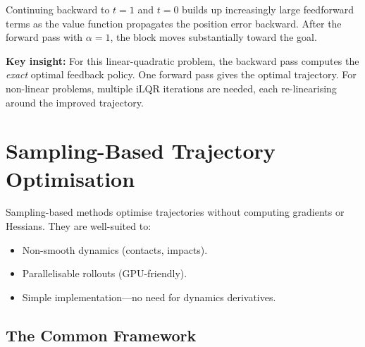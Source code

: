 \documentclass[11pt,twoside]{report}
\theoremstyle{definition}
\theoremstyle{plain}
\theoremstyle{remark}
\newcommand{\0}{\bm{0}}
\begin{document}
\begin{stepbox}[Step-by-step: iLQR backward pass on the block ($T=3$, $h=1/3$, $w=100$)]
Continuing backward to $t=1$ and $t=0$ builds up increasingly large feedforward terms as the value function propagates the position error backward.  After the forward pass with $\alpha=1$, the block moves substantially toward the goal.

\textbf{Key insight:} For this linear-quadratic problem, the backward pass computes the \emph{exact} optimal feedback policy. One forward pass gives the optimal trajectory. For non-linear problems, multiple iLQR iterations are needed, each re-linearising around the improved trajectory.
\end{stepbox}

\begin{center}
\end{center}


\chapter{Sampling-Based Trajectory Optimisation}
\label{ch:sampling}

Sampling-based methods optimise trajectories without computing
gradients or Hessians.  They are well-suited to:
\begin{itemize}
\item Non-smooth dynamics (contacts, impacts).
\item Parallelisable rollouts (GPU-friendly).
\item Simple implementation---no need for dynamics derivatives.
\end{itemize}

\section{The Common Framework}
\label{sec:sampling-framework}
\end{document}
